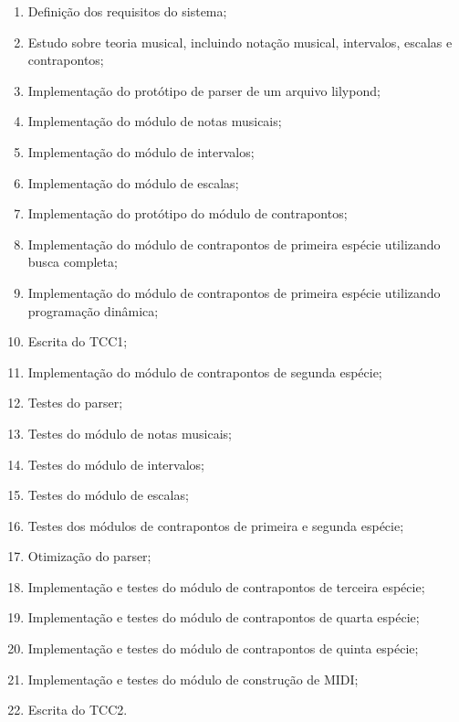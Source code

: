   \begin{enumerate}
    \item \label{t1} Definição dos requisitos do sistema;
    \item \label{t2} Estudo sobre teoria musical, incluindo notação musical, intervalos, escalas e contrapontos;
    \item \label{t3} Implementação do protótipo de parser de um arquivo lilypond;
    \item \label{t4} Implementação do módulo de notas musicais;
    \item \label{t5} Implementação do módulo de intervalos;
    \item \label{t6} Implementação do módulo de escalas;
    \item \label{t7} Implementação do protótipo do módulo de contrapontos;
    \item \label{t8} Implementação do módulo de contrapontos de primeira espécie utilizando busca completa;
    \item \label{t9} Implementação do módulo de contrapontos de primeira espécie utilizando programação dinâmica;
    \item \label{t10} Escrita do TCC1;
    \item \label{t11} Implementação do módulo de contrapontos de segunda espécie;
    \item \label{t12} Testes do parser;
    \item \label{t13} Testes do módulo de notas musicais;
    \item \label{t14} Testes do módulo de intervalos;
    \item \label{t15} Testes do módulo de escalas;
    \item \label{t16} Testes dos módulos de contrapontos de primeira e segunda espécie;
    \item \label{t17} Otimização do parser;
    \item \label{t18} Implementação e testes do módulo de contrapontos de terceira espécie;
    \item \label{t19} Implementação e testes do módulo de contrapontos de quarta espécie;
    \item \label{t20} Implementação e testes do módulo de contrapontos de quinta espécie;
    \item \label{t21} Implementação e testes do módulo de construção de MIDI;
    \item \label{t22} Escrita do TCC2.
  \end{enumerate}

